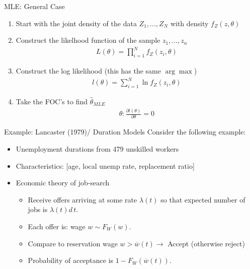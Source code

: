 \documentclass[aspectratio=169]{beamer}
\begin{document}
\begin{frame}{MLE: General Case}
\begin{enumerate}
\item Start with the \alert{joint density of the data} $Z_1,\ldots,Z_N$ with density $f_Z(z,\theta)$
\item Construct the likelhood function of the sample $z_1,\ldots,z_n$
\begin{align*}
L(\theta) = \prod_{i=1}^N f_Z(z_i,\theta)
\end{align*}
\item Construct the \alert{log likelihood} (this has the same $\arg \max$)
\begin{align*}
l(\theta) = \sum_{i=1}^N \ln f_Z(z_i,\theta)
\end{align*}
\item Take the FOC's to find $\widehat{\theta}_{MLE}$
\begin{align*}
\theta : \frac{\partial l(\theta)}{\partial \theta} =0
\end{align*}
\end{enumerate}
\end{frame}


\begin{frame}{Example: Lancaster (1979)/ Duration Models}
Consider the following example:
\begin{itemize}
\item Unemployment durations from 479 unskilled workers
\item Characteristics: [age, local unemp rate, \alert{replacement ratio}]
\item Economic theory of job-search
\begin{itemize}
\item Receive offers arriving at some rate $\lambda(t)$ so that expected number of jobs is $\lambda(t) d\,t$.
\item Each offer is: wage $w \sim F_{W}(w)$.
\item Compare to reservation wage $w > \overline{w}(t) \rightarrow$ Accept  (otherwise reject)
\item Probability of acceptance is $1 - F_{W}(\overline{w}(t))$.
\end{itemize}
\end{itemize}
\end{frame}
\end{document}
